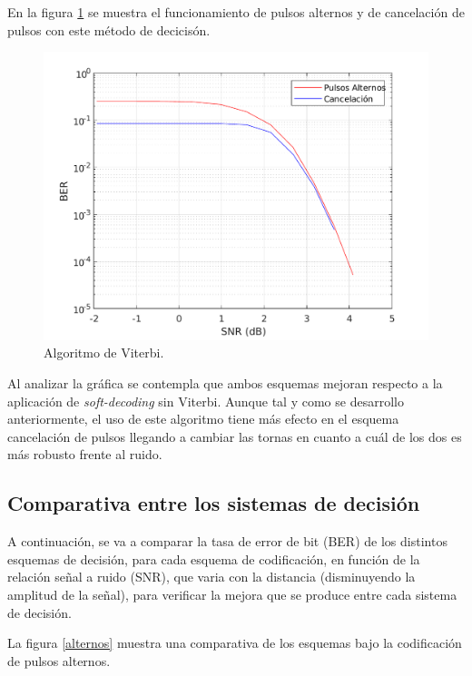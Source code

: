 En la figura \ref{viterbi} se muestra el funcionamiento de pulsos alternos y de cancelación de pulsos
con este método de decicisón.

\begin{figure}[ht]
    \centering
    \includegraphics[scale=0.6]{./figuras/Viterbi.pdf}
    \caption{\small{Algoritmo de Viterbi.}}
    \label{viterbi}%
\end{figure}

Al analizar la gráfica se contempla que ambos esquemas mejoran respecto a la aplicación
de \textit{soft-decoding} sin Viterbi. Aunque tal y como se desarrollo anteriormente,
el uso de este algoritmo tiene más efecto en el esquema cancelación de pulsos llegando
a cambiar las tornas en cuanto a cuál de los dos es más robusto frente al ruido.


\subsection{Comparativa entre los sistemas de decisión}
A continuación, se va a comparar la tasa de error de bit (BER) de los distintos esquemas de decisión, para cada esquema 
de codificación, en función de la relación señal a ruido (SNR), que varia con la distancia (disminuyendo la 
amplitud de la señal), para verificar la mejora que se produce entre cada sistema de decisión.

La figura \ref{alternos} muestra una comparativa de los esquemas bajo 
la codificación de pulsos alternos.

